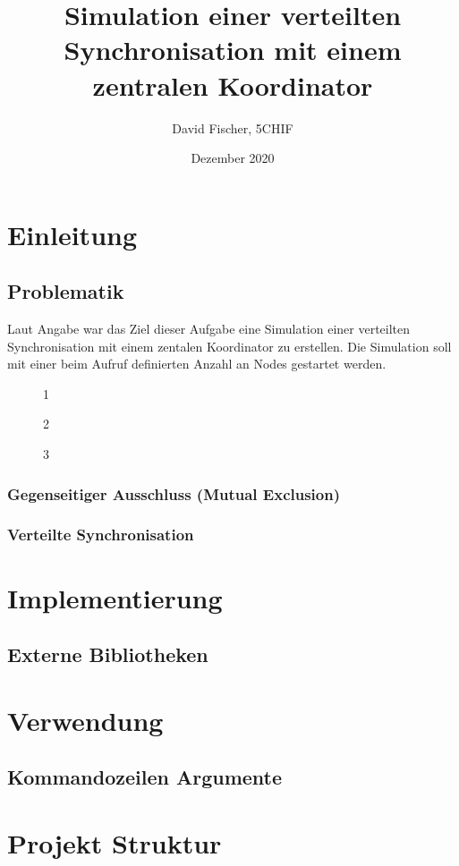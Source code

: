\documentclass[12pt, letterpaper]{article}
\title{Simulation einer verteilten Synchronisation mit einem zentralen Koordinator}
\author{David Fischer, 5CHIF}
\date{Dezember 2020}
\begin{document}
\begin{titlepage}
\maketitle
\end{titlepage}

\tableofcontents
\newpage

\section{Einleitung}

\subsection{Problematik}
Laut Angabe war das Ziel dieser Aufgabe eine Simulation einer verteilten Synchronisation mit einem zentalen Koordinator zu erstellen. Die Simulation soll mit einer beim Aufruf definierten Anzahl an Nodes gestartet werden.

\begin{figure}[H]
    \centering
    \resizebox{0.5\textwidth}{!}{}
    \caption{1}
    \label{fig:situation1}
\end{figure}

\begin{figure}[H]
    \centering
    \resizebox{0.5\textwidth}{!}{}
    \caption{2}
    \label{fig:situation2}
\end{figure}


\begin{figure}[H]
    \centering
    \resizebox{0.5\textwidth}{!}{}
    \caption{3}
    \label{fig:situation3}
\end{figure}


\subsubsection{Gegenseitiger Ausschluss (Mutual Exclusion)}

\subsubsection{Verteilte Synchronisation}

\section{Implementierung}

\subsection{Externe Bibliotheken}

\section{Verwendung}

\subsection{Kommandozeilen Argumente}

\section{Projekt Struktur}


\newpage


\end{document}
